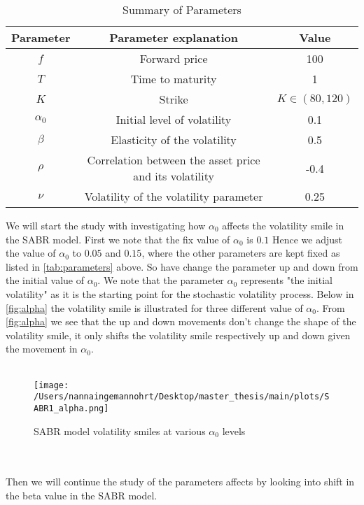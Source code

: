 \begin{table}[htbp]
    \centering
    \begin{tabular}{ccc}
      \toprule
      \textbf{Parameter} & \textbf{Parameter explanation} & \textbf{Value} \\
      \midrule
      $f$ & Forward price & 100 \\
      $T$ & Time to maturity & 1 \\
      $K$ & Strike & $K \in (80,120)$ \\
      $\alpha_0$ & Initial level of volatility & 0.1 \\
      $\beta$ & Elasticity of the volatility & 0.5 \\
      $\rho$ & Correlation between the asset price and its volatility & -0.4 \\
      $\nu$ & Volatility of the volatility parameter & 0.25 \\
      \bottomrule
    \end{tabular}
    \caption{Summary of Parameters}
    \label{tab:parameters}
\end{table}
\noindent
We will start the study with investigating how $\alpha_0$ affects the volatility smile in the SABR model. 
First we note that the fix value of $\alpha_0$ is $0.1$ Hence we adjust the value of $\alpha_0$ to $0.05$ and $0.15$,
where the other parameters are kept fixed as listed in \autoref{tab:parameters} above. So have change the parameter
up and down from the initial value of $\alpha_0$.
We note that the parameter $\alpha_0$
represents "the initial volatility" as it is the starting point for the stochastic volatility process. 
Below in \autoref{fig:alpha} the volatility smile is illustrated for three different value of $\alpha_0$. 
From \autoref{fig:alpha} we see that the up and down movements don't change the shape of the volatility smile, 
it only shifts the volatility smile respectively up and down given the movement in $\alpha_0$.
\\\\
\begin{figure}[htbp]
    \centering
    \texttt{[image: /Users/nannaingemannohrt/Desktop/master\_thesis/main/plots/SABR1\_alpha.png]}
    \caption{SABR model volatility smiles at various $\alpha_0$ levels}
    \label{fig:alpha}
\end{figure}
\\\\
\noindent
Then we will continue the study of the parameters affects by looking into shift in the beta value in the SABR model.
